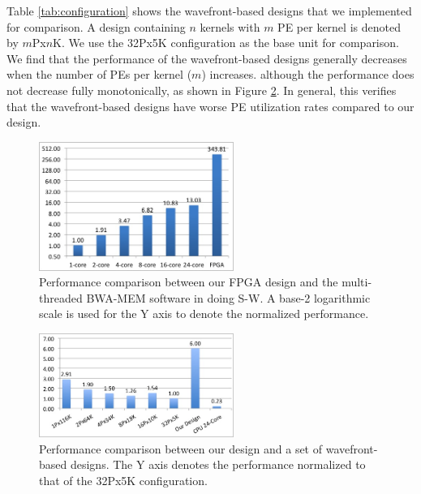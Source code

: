 Table \ref{tab:configuration} shows the wavefront-based designs that we implemented for comparison. 
A design containing $n$ kernels with $m$ PE per kernel is denoted by $m$Px$n$K. 
We use the 32Px5K configuration as the base unit for comparison.
We find that the performance of the wavefront-based designs generally decreases when the number of PEs per kernel ($m$) increases.
although the performance does not decrease fully monotonically, as shown in Figure \ref{fig:F2C5}.
In general, this verifies that the wavefront-based designs have worse PE utilization rates compared to our design. 

\begin{figure}[!hbt]
	\begin{center}
		\includegraphics[width=2.5in]{Figures/F1C5.jpg}
		\caption {Performance comparison between our FPGA design and the multi-threaded BWA-MEM software in doing S-W. A base-2 logarithmic scale is used for the Y axis to denote the normalized performance.}
		\label{fig:F1C5}
	\end{center}
\end{figure}
\vspace{-20pt}

\begin{figure}[!hbt]
	\begin{center}
		\includegraphics[width=2.5in]{Figures/F2C5.jpg}
		\caption {Performance comparison between our design and a set of wavefront-based designs. The Y axis denotes the performance normalized to that of the 32Px5K configuration.}
		\label{fig:F2C5}
	\end{center}
\end{figure}
\vspace{-10pt}

